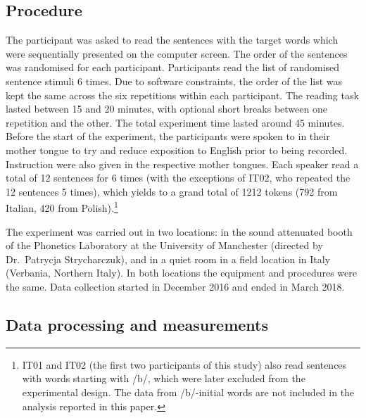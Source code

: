 \documentclass[12pt,]{article}
\let\rmarkdownfootnote\footnote%
\def\footnote{\protect\rmarkdownfootnote}
\begin{document}
\hypertarget{procedure}{%
\subsection{Procedure}\label{procedure}}

The participant was asked to read the sentences with the target words
which were sequentially presented on the computer screen. The order of
the sentences was randomised for each participant. Participants read the
list of randomised sentence stimuli 6 times. Due to software
constraints, the order of the list was kept the same across the six
repetitions within each participant. The reading task lasted between 15
and 20 minutes, with optional short breaks between one repetition and
the other. The total experiment time lasted around 45 minutes. Before
the start of the experiment, the participants were spoken to in their
mother tongue to try and reduce exposition to English prior to being
recorded. Instruction were also given in the respective mother tongues.
Each speaker read a total of 12 sentences for 6 times (with the
exceptions of IT02, who repeated the 12 sentences 5 times), which yields
to a grand total of 1212 tokens (792 from Italian, 420 from
Polish).\footnote{IT01 and IT02 (the first two participants of this study) also read sentences with words starting with /b/, which were later excluded from the experimental design. The data from /b/-initial words are not included in the analysis reported in this paper.}

The experiment was carried out in two locations: in the sound attenuated
booth of the Phonetics Laboratory at the University of Manchester
(directed by Dr.~Patrycja Strycharczuk), and in a quiet room in a field
location in Italy (Verbania, Northern Italy). In both locations the
equipment and procedures were the same. Data collection started in
December 2016 and ended in March 2018.

\hypertarget{data-processing-and-measurements}{%
\subsection{Data processing and
measurements}\label{data-processing-and-measurements}}
\end{document}
